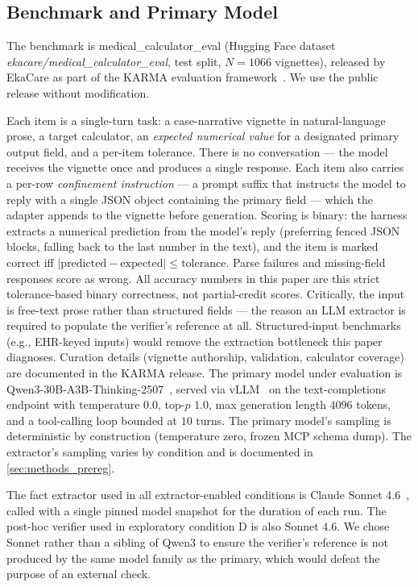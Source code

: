 \subsection{Benchmark and Primary Model}
\label{sec:methods_benchmark}

The benchmark is medical\_calculator\_eval (Hugging Face dataset
\textit{ekacare/medical\_calculator\_eval}, test split, $N=1066$
vignettes), released by EkaCare as part of the KARMA evaluation
framework~\citep{karma2024}. We use the public release without
modification.

Each item is a single-turn task: a case-narrative vignette in
natural-language prose, a target calculator, an \emph{expected
numerical value} for a designated primary output field, and a
per-item tolerance. There is no conversation --- the model receives
the vignette once and produces a single response. Each item also
carries a per-row \emph{confinement instruction} --- a prompt suffix
that instructs the model to reply with a single JSON object
containing the primary field --- which the adapter appends to the
vignette before generation. Scoring is binary: the harness extracts a
numerical prediction from the model's reply (preferring fenced JSON
blocks, falling back to the last number in the text), and the item is
marked correct iff
$|\text{predicted} - \text{expected}| \le \text{tolerance}$. Parse
failures and missing-field responses score as wrong. All accuracy
numbers in this paper are this strict tolerance-based binary
correctness, not partial-credit scores. Critically, the input is
free-text prose rather than structured fields --- the reason an LLM
extractor is required to populate the verifier's reference at all.
Structured-input benchmarks (e.g., EHR-keyed inputs) would remove
the extraction bottleneck this paper diagnoses. Curation details
(vignette authorship, validation, calculator coverage) are documented
in the KARMA release. The primary model under evaluation is
Qwen3-30B-A3B-Thinking-2507~\citep{qwen3_thinking}, served via
vLLM~\citep{vllm2023} on the text-completions endpoint with
temperature $0.0$, top-$p$ $1.0$, max generation length $4096$ tokens,
and a tool-calling loop bounded at $10$ turns. The primary model's
sampling is deterministic by construction (temperature zero, frozen
MCP schema dump). The extractor's sampling varies by condition and
is documented in \cref{sec:methods_prereg}.

The fact extractor used in all extractor-enabled conditions is Claude
Sonnet 4.6~\citep{claude_sonnet_4_6}, called with a single pinned
model snapshot for the duration of each run. The post-hoc verifier
used in exploratory condition D is also Sonnet 4.6. We chose Sonnet
rather than a sibling of Qwen3 to ensure the verifier's reference is
not produced by the same model family as the primary, which would
defeat the purpose of an external check.

